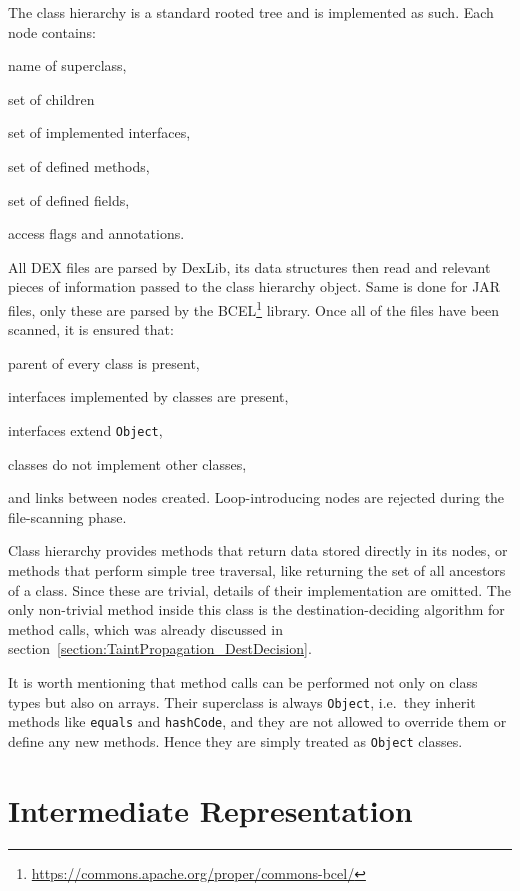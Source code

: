 \documentclass[12pt,twoside,notitlepage]{report}
\begin{document}
The class hierarchy is a standard rooted tree and is implemented as such. Each node contains:
\begin{inparaenum}[(i)]
\item name of superclass,
\item set of children
\item set of implemented interfaces,
\item set of defined methods,
\item set of defined fields,
\item access flags and annotations.
\end{inparaenum}

All DEX files are parsed by DexLib, its data structures then read and relevant pieces of information passed to the class hierarchy object. Same is done for JAR files, only these are parsed by the BCEL\footnote{\scriptsize\url{https://commons.apache.org/proper/commons-bcel/}} library. Once all of the files have been scanned, it is ensured that:
\begin{inparaenum}[(i)]
\item parent of every class is present,
\item interfaces implemented by classes are present,
\item interfaces extend \verb$Object$,
\item classes do not implement other classes,
\end{inparaenum}
and links between nodes created. Loop-introducing nodes are rejected during the file-scanning phase.

Class hierarchy provides methods that return data stored directly in its nodes, or methods that perform simple tree traversal, like returning the set of all ancestors of a class. Since these are trivial, details of their implementation are omitted. The only non-trivial method inside this class is the destination-deciding algorithm for method calls, which was already discussed in section~\ref{section:TaintPropagation_DestDecision}. 

It is worth mentioning that method calls can be performed not only on class types but also on arrays. Their superclass is always \verb$Object$, i.e.\ they inherit methods like \verb$equals$ and \verb$hashCode$, and they are not allowed to override them or define any new methods. Hence they are simply treated as \verb$Object$ classes. 

\section{Intermediate Representation}
\end{document}
